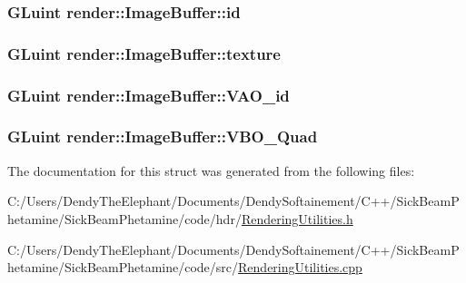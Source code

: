 \subsubsection[{\texorpdfstring{id}{id}}]{\setlength{\rightskip}{0pt plus 5cm}G\+Luint render\+::\+Image\+Buffer\+::id}\hypertarget{structrender_1_1_image_buffer_a5eb359e2da33efc3431498da51c9c835}{}\label{structrender_1_1_image_buffer_a5eb359e2da33efc3431498da51c9c835}
\subsubsection[{\texorpdfstring{texture}{texture}}]{\setlength{\rightskip}{0pt plus 5cm}G\+Luint render\+::\+Image\+Buffer\+::texture}\hypertarget{structrender_1_1_image_buffer_ad7388b16adfbf213a0c4b034cc9e1b1b}{}\label{structrender_1_1_image_buffer_ad7388b16adfbf213a0c4b034cc9e1b1b}
\subsubsection[{\texorpdfstring{V\+A\+O\+\_\+id}{VAO_id}}]{\setlength{\rightskip}{0pt plus 5cm}G\+Luint render\+::\+Image\+Buffer\+::\+V\+A\+O\+\_\+id}\hypertarget{structrender_1_1_image_buffer_a19730c873417ad42b078ca417fd0e9c0}{}\label{structrender_1_1_image_buffer_a19730c873417ad42b078ca417fd0e9c0}
\subsubsection[{\texorpdfstring{V\+B\+O\+\_\+\+Quad}{VBO_Quad}}]{\setlength{\rightskip}{0pt plus 5cm}G\+Luint render\+::\+Image\+Buffer\+::\+V\+B\+O\+\_\+\+Quad}\hypertarget{structrender_1_1_image_buffer_aebf2fbc32627fe92db9249ba45211f6d}{}\label{structrender_1_1_image_buffer_aebf2fbc32627fe92db9249ba45211f6d}


The documentation for this struct was generated from the following files\+:\begin{DoxyCompactItemize}
\item 
C\+:/\+Users/\+Dendy\+The\+Elephant/\+Documents/\+Dendy\+Softainement/\+C++/\+Sick\+Beam\+Phetamine/\+Sick\+Beam\+Phetamine/code/hdr/\hyperlink{_rendering_utilities_8h}{Rendering\+Utilities.\+h}\item 
C\+:/\+Users/\+Dendy\+The\+Elephant/\+Documents/\+Dendy\+Softainement/\+C++/\+Sick\+Beam\+Phetamine/\+Sick\+Beam\+Phetamine/code/src/\hyperlink{_rendering_utilities_8cpp}{Rendering\+Utilities.\+cpp}\end{DoxyCompactItemize}
